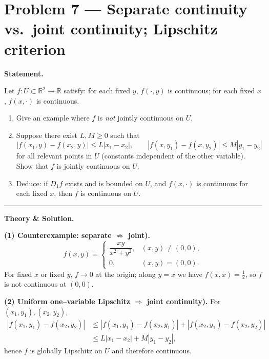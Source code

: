 \documentclass[12pt,a4paper]{article}
\theoremstyle{plain}
\theoremstyle{definition}
\theoremstyle{remark}
\theoremstyle{remark}
\newcommand{\gap}{\vspace{6pt}}
\begin{document}

\section*{Problem 7 — Separate continuity vs.\ joint continuity; Lipschitz criterion}

\textbf{Statement.}\gap

Let $f:U\subset\mathbb{R}^2\to\mathbb{R}$ satisfy:
for each fixed $y$, $f(\cdot,y)$ is continuous; for each fixed $x$, $f(x,\cdot)$ is continuous.
\begin{enumerate}\setlength{\itemsep}{6pt}
	\item Give an example where $f$ is \emph{not} jointly continuous on $U$.
	\item Suppose there exist $L,M\ge0$ such that
	\[
	|f(x_1,y)-f(x_2,y)|\le L|x_1-x_2|, \qquad
	|f(x,y_1)-f(x,y_2)|\le M|y_1-y_2|
	\]
	for all relevant points in $U$ (constants independent of the other variable).
	Show that $f$ is jointly continuous on $U$.
	\item Deduce: if $D_1 f$ exists and is bounded on $U$, and $f(x,\cdot)$ is continuous for each fixed $x$,
	then $f$ is continuous on $U$.
\end{enumerate}

\bigskip\hrule\bigskip

\textbf{Theory \& Solution.}\gap

\textbf{(1) Counterexample: separate $\not\Rightarrow$ joint).}\;
\[
f(x,y)=
\begin{cases}
	\dfrac{xy}{x^2+y^2}, & (x,y)\neq(0,0),\\[4pt]
	0,&(x,y)=(0,0).
\end{cases}
\]
For fixed $x$ or fixed $y$, $f\to 0$ at the origin; along $y=x$ we have $f(x,x)=\tfrac12$, so $f$ is not continuous at $(0,0)$.

\medskip

\textbf{(2) Uniform one–variable Lipschitz $\Rightarrow$ joint continuity).}\;
For $(x_1,y_1),(x_2,y_2)$,
\[
\begin{aligned}
	|f(x_1,y_1)-f(x_2,y_2)|
	&\le |f(x_1,y_1)-f(x_2,y_1)| + |f(x_2,y_1)-f(x_2,y_2)|\\
	&\le L|x_1-x_2| + M|y_1-y_2|,
\end{aligned}
\]
hence $f$ is globally Lipschitz on $U$ and therefore continuous.

\medskip
\end{document}
